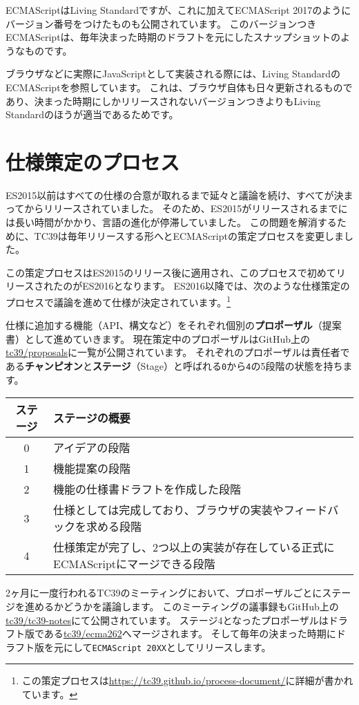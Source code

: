 ECMAScriptはLiving Standardですが、これに加えてECMAScript
2017のようにバージョン番号をつけたものも公開されています。
このバージョンつきECMAScriptは、毎年決まった時期のドラフトを元にしたスナップショットのようなものです。

ブラウザなどに実際にJavaScriptとして実装される際には、Living
StandardのECMAScriptを参照しています。
これは、ブラウザ自体も日々更新されるものであり、決まった時期にしかリリースされないバージョンつきよりもLiving
Standardのほうが適当であるためです。

\hypertarget{specification-process}{%
\section{仕様策定のプロセス}\label{specification-process}}

ES2015以前はすべての仕様の合意が取れるまで延々と議論を続け、すべてが決まってからリリースされていました。
そのため、ES2015がリリースされるまでには長い時間がかかり、言語の進化が停滞していました。
この問題を解消するために、TC39は毎年リリースする形へとECMAScriptの策定プロセスを変更しました。

この策定プロセスはES2015のリリース後に適用され、このプロセスで初めてリリースされたのがES2016となります。
ES2016以降では、次のような仕様策定のプロセスで議論を進めて仕様が決定されています。\footnote{この策定プロセスは\url{https://tc39.github.io/process-document/}に詳細が書かれています。}

仕様に追加する機能（API、構文など）をそれぞれ個別の\textbf{プロポーザル}（提案書）として進めていきます。
現在策定中のプロポーザルはGitHub上の\href{https://github.com/tc39/proposals}{tc39/proposals}に一覧が公開されています。
それぞれのプロポーザルは責任者である\textbf{チャンピオン}と\textbf{ステージ}（Stage）と呼ばれる\texttt{0}から\texttt{4}の5段階の状態を持ちます。

\begin{longtable}[]{@{}cl@{}}
\toprule
ステージ & ステージの概要\tabularnewline
\midrule
\endhead
0 & アイデアの段階\tabularnewline
1 & 機能提案の段階\tabularnewline
2 & 機能の仕様書ドラフトを作成した段階\tabularnewline
3 &
仕様としては完成しており、ブラウザの実装やフィードバックを求める段階\tabularnewline
4 &
仕様策定が完了し、2つ以上の実装が存在している正式にECMAScriptにマージできる段階\tabularnewline
\bottomrule
\end{longtable}

2ヶ月に一度行われるTC39のミーティングにおいて、プロポーザルごとにステージを進めるかどうかを議論します。
このミーティングの議事録もGitHub上の\href{https://github.com/tc39/tc39-notes}{tc39/tc39-notes}にて公開されています。
ステージ4となったプロポーザルはドラフト版である\href{https://github.com/tc39/ecma262}{tc39/ecma262}へマージされます。
そして毎年の決まった時期にドラフト版を元にして\texttt{ECMAScript 20XX}としてリリースします。

